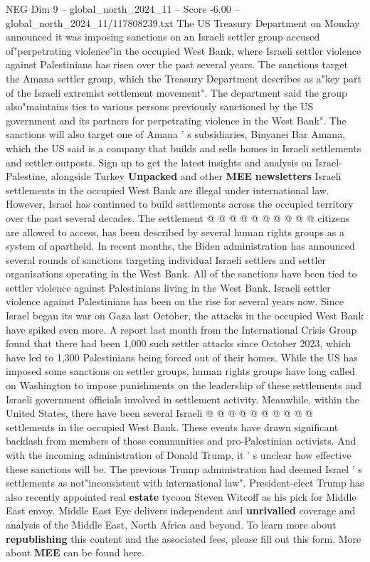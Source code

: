 \begin{textsample}{NEG Dim 9 – global\_north\_2024\_11 – Score -6.00 – global\_north\_2024\_11/117808239.txt}  \label{ex:f9_neg_050}
The US Treasury Department on Monday announced it was imposing sanctions on an Israeli settler group accused of"perpetrating violence"in the occupied West Bank, where Israeli settler violence against Palestinians has risen over the past several years.
The sanctions target the Amana settler group, which the Treasury Department describes as a"key part of the Israeli extremist settlement movement".
The department said the group also"maintains ties to various persons previously sanctioned by the US government and its partners for perpetrating violence in the West Bank".
The sanctions will also target one of Amana ' s subsidiaries, Binyanei Bar Amana, which the US said is a company that builds and sells homes in Israeli settlements and settler outposts.
Sign up to get the latest insights and analysis on Israel-Palestine, alongside Turkey \textbf{Unpacked} and other \textbf{MEE} \textbf{newsletters} Israeli settlements in the occupied West Bank are illegal under international law.
However, Israel has continued to build settlements across the occupied territory over the past several decades.
The settlement @ @ @ @ @ @ @ @ @ @ citizens are allowed to access, has been described by several human rights groups as a system of apartheid.
In recent months, the Biden administration has announced several rounds of sanctions targeting individual Israeli settlers and settler organisations operating in the West Bank.
All of the sanctions have been tied to settler violence against Palestinians living in the West Bank.
Israeli settler violence against Palestinians has been on the rise for several years now.
Since Israel began its war on Gaza last October, the attacks in the occupied West Bank have spiked even more.
A report last month from the International Crisis Group found that there had been 1,000 such settler attacks since October 2023, which have led to 1,300 Palestinians being forced out of their homes.
While the US has imposed some sanctions on settler groups, human rights groups have long called on Washington to impose punishments on the leadership of these settlements and Israeli government officials involved in settlement activity.
Meanwhile, within the United States, there have been several Israeli @ @ @ @ @ @ @ @ @ @ settlements in the occupied West Bank.
These events have drawn significant backlash from members of those communities and pro-Palestinian activists.
And with the incoming administration of Donald Trump, it ' s unclear how effective these sanctions will be.
The previous Trump administration had deemed Israel ' s settlements as not"inconsistent with international law".
President-elect Trump has also recently appointed real \textbf{estate} tycoon Steven Witcoff as his pick for Middle East envoy.
Middle East Eye delivers independent and \textbf{unrivalled} coverage and analysis of the Middle East, North Africa and beyond.
To learn more about \textbf{republishing} this content and the associated fees, please fill out this form.
More about \textbf{MEE} can be found here.

\end{textsample}
